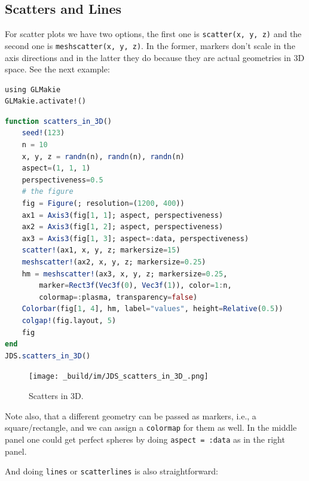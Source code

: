 \documentclass[
  notoc %
]{tufte-book}
\newcommand{\passthrough}[1]{#1}
\begin{document}
\hypertarget{scatters-and-lines}{%
\subsection{Scatters and Lines}\label{scatters-and-lines}}

For scatter plots we have two options, the first one is
\passthrough{\lstinline!scatter(x, y, z)!} and the second one is
\passthrough{\lstinline!meshscatter(x, y, z)!}. In the former, markers
don't scale in the axis directions and in the latter they do because
they are actual geometries in 3D space. See the next example:

\begin{lstlisting}
using GLMakie
GLMakie.activate!()
\end{lstlisting}

\begin{lstlisting}[language=Julia]
function scatters_in_3D()
    seed!(123)
    n = 10
    x, y, z = randn(n), randn(n), randn(n)
    aspect=(1, 1, 1)
    perspectiveness=0.5
    # the figure
    fig = Figure(; resolution=(1200, 400))
    ax1 = Axis3(fig[1, 1]; aspect, perspectiveness)
    ax2 = Axis3(fig[1, 2]; aspect, perspectiveness)
    ax3 = Axis3(fig[1, 3]; aspect=:data, perspectiveness)
    scatter!(ax1, x, y, z; markersize=15)
    meshscatter!(ax2, x, y, z; markersize=0.25)
    hm = meshscatter!(ax3, x, y, z; markersize=0.25,
        marker=Rect3f(Vec3f(0), Vec3f(1)), color=1:n,
        colormap=:plasma, transparency=false)
    Colorbar(fig[1, 4], hm, label="values", height=Relative(0.5))
    colgap!(fig.layout, 5)
    fig
end
JDS.scatters_in_3D()
\end{lstlisting}

\begin{figure}
\hypertarget{fig:scatters_in_3D}{%
\centering
\texttt{[image: \_build/im/JDS\_scatters\_in\_3D\_.png]}
\caption{Scatters in 3D.}\label{fig:scatters_in_3D}
}
\end{figure}

Note also, that a different geometry can be passed as markers, i.e., a
square/rectangle, and we can assign a \passthrough{\lstinline!colormap!}
for them as well. In the middle panel one could get perfect spheres by
doing \passthrough{\lstinline!aspect = :data!} as in the right panel.

And doing \passthrough{\lstinline!lines!} or
\passthrough{\lstinline!scatterlines!} is also straightforward:
\end{document}
